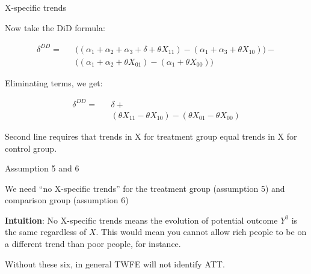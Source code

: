 \documentclass{beamer}
\begin{document}
\begin{frame}{X-specific trends}

Now take the DiD formula:

\begin{eqnarray*}
\delta^{DD} = &&\bigg ( (\alpha_1 + \alpha_2 + \alpha_3 + \delta + \theta X_{11} ) - (\alpha_1 + \alpha_3 + \theta X_{10} ) \bigg )- \\
&& \bigg ( (\alpha_1 + \alpha_2 + \theta X_{01}) - (\alpha_1 + \theta X_{00}) \bigg )
\end{eqnarray*}

\bigskip

Eliminating terms, we get:

\begin{eqnarray*}
\delta^{DD} = &&\delta + \\
&& (\theta X_{11} - \theta X_{10} ) - (\theta X_{01} - \theta X_{00} )
\end{eqnarray*}

\bigskip

Second line requires that trends in X for treatment group equal trends in X for control group.

\end{frame}


\begin{frame}{Assumption 5 and 6}

We need ``no X-specific trends'' for the treatment group (assumption 5) and comparison group (assumption 6)

\bigskip

\textbf{Intuition}: No X-specific trends means the evolution of potential outcome $Y^0$ is the same regardless of $X$. This would mean you cannot allow rich people to be on a different trend than poor people, for instance.

\bigskip

Without these six, in general TWFE will not identify ATT. 

\end{frame}
\end{document}

